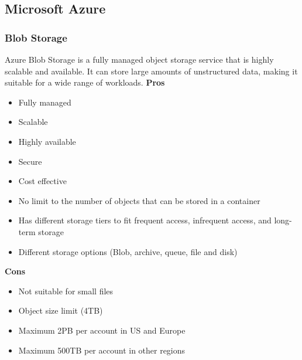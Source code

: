     \subsection{Microsoft Azure}
    
        \subsubsection{Blob Storage}
        \label{azure:blob-storage}
        Azure Blob Storage is a fully managed object storage service that is highly scalable and available. 
        It can store large amounts of unstructured data, making it suitable for a wide range of workloads. 
        \textbf{Pros}
        \begin{itemize}
            \item Fully managed
            \item Scalable
            \item Highly available
            \item Secure
            \item Cost effective
            \item No limit to the number of objects that can be stored in a container
            \item Has different storage tiers to fit frequent access, infrequent access, and long-term storage
            \item Different storage options (Blob, archive, queue, file and disk) 
        \end{itemize}
        \textbf{Cons}
        \begin{itemize}
            \item Not suitable for small files
            \item Object size limit (4TB)
            \item Maximum 2PB per account in US and Europe
            \item Maximum 500TB per account in other regions
        \end{itemize}

